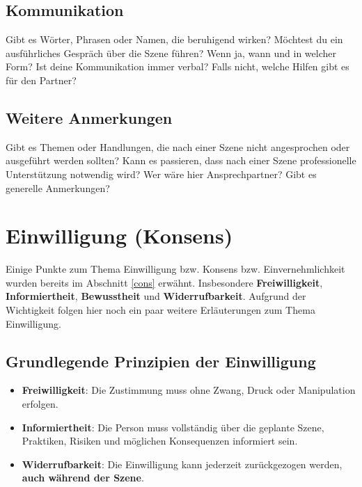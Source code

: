 \documentclass[a4paper,12pt]{article}
\begin{document}
\subsection{Kommunikation}
\noindent Gibt es Wörter, Phrasen oder Namen, die beruhigend wirken? Möchtest du ein ausführliches Gespräch über die Szene führen? Wenn ja, wann und in welcher Form? Ist deine Kommunikation immer verbal? Falls nicht, welche Hilfen gibt es für den Partner?\newline
\noindent \TextField[name=AftercareKommunikation,multiline=true,height=7em, width=37em]{}

\subsection{Weitere Anmerkungen}
\noindent Gibt es Themen oder Handlungen, die nach einer Szene nicht angesprochen oder ausgeführt werden sollten? Kann es passieren, dass nach einer Szene professionelle Unterstützung notwendig wird? Wer wäre hier Ansprechpartner? Gibt es generelle Anmerkungen?\newline
\noindent \TextField[name=AftercareBesonders,multiline=true,height=17em, width=37em]{}


\newpage
\section{Einwilligung (Konsens)}
Einige Punkte zum Thema Einwilligung bzw. Konsens bzw. Einvernehmlichkeit wurden bereits im Abschnitt \ref{cons} erwähnt. Insbesondere \textbf{Freiwilligkeit}, \textbf{Informiertheit}, \textbf{Bewusstheit} und \textbf{Widerrufbarkeit}. Aufgrund der Wichtigkeit folgen hier noch ein paar weitere Erläuterungen zum Thema Einwilligung.

\subsection{Grundlegende Prinzipien der Einwilligung}
\begin{itemize}
	\item \textbf{Freiwilligkeit}: Die Zustimmung muss ohne Zwang, Druck oder Manipulation erfolgen.
	\item \textbf{Informiertheit}: Die Person muss vollständig über die geplante Szene, Praktiken, Risiken und möglichen Konsequenzen informiert sein.
	\item \textbf{Widerrufbarkeit}: Die Einwilligung kann jederzeit zurückgezogen werden, \textbf{auch während der Szene}.
\end{itemize}
\end{document}
